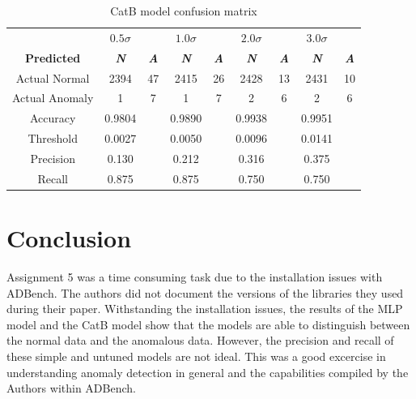 \begin{table}[htbp]
    \caption{CatB model confusion matrix}\label{tab5}
    \begin{center}
        \begin{tabular}{c|cc|cc|cc|cc}
            \toprule 
                & $0.5\sigma$& &  $1.0\sigma$ & & $2.0\sigma$ & & $3.0\sigma$\\           
            \textbf{Predicted}  & \textbf{\textit{N}} & \textbf{\textit{A}}& \textbf{\textit{N}} & \textbf{\textit{A}}& \textbf{\textit{N}} & \textbf{\textit{A}}& \textbf{\textit{N}} & \textbf{\textit{A}}\\
            \midrule
            Actual Normal & 2394 & 47 & 2415 & 26 & 2428 & 13 & 2431 & 10\\
            Actual Anomaly & 1 & 7 & 1 & 7& 2 & 6 & 2 & 6\\
            \midrule
            Accuracy & 0.9804 & & 0.9890 & & 0.9938 & & 0.9951 & \\
            Threshold & 0.0027 & & 0.0050 & & 0.0096 & & 0.0141 & \\
            Precision & 0.130 & & 0.212 & & 0.316 & & 0.375 & \\
            Recall & 0.875 & & 0.875 & & 0.750 & & 0.750 & \\
            \bottomrule
        \end{tabular}
    \end{center}
\end{table}


\section{Conclusion}

Assignment 5 was a time consuming task due to the installation issues with ADBench. The authors did not document the versions of the libraries they used during their paper.
Withstanding the installation issues, the results of the MLP model and the CatB model show that the models are able to distinguish between the normal data and the anomalous data.
However, the precision and recall of these simple and untuned models are not ideal. This was a good excercise in understanding anomaly detection in general and the capabilities compiled by the Authors within ADBench.








